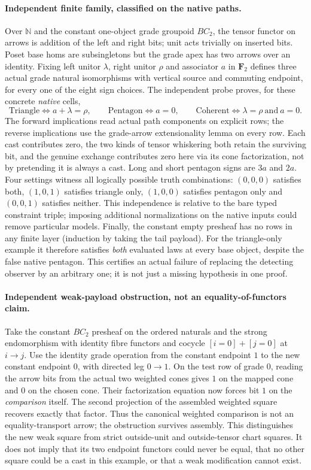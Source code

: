 \documentclass[11pt]{article}
\begin{document}
\paragraph{Independent finite family, classified on the native paths.}
Over $\mathbb{N}$ and the constant one-object grade groupoid $BC_2$,
the tensor functor on arrows is addition of the left and right bits;
unit acts trivially on inserted bits. Poset base homs are subsingletons
but the grade apex has two arrows over an identity. Fixing left unitor
$\lambda$, right unitor $\rho$ and associator $a$ in $\mathbf F_2$
defines three actual grade natural isomorphisms with vertical source
and commuting endpoint, for every one of the eight sign choices.
The independent probe proves, for these concrete \emph{native} cells,
\[
  \mathrm{Triangle}\iff a+\lambda=\rho,\qquad
  \mathrm{Pentagon}\iff a=0,\qquad
  \mathrm{Coherent}\iff \lambda=\rho\ \text{and}\ a=0.
\]
The forward implications read actual path components on explicit rows;
the reverse implications use the grade-arrow extensionality lemma on
every row. Each cast contributes zero, the two kinds of tensor
whiskering both retain the surviving bit, and the genuine exchange
contributes zero here via its cone factorization, not by pretending it
is always a cast. Long and short pentagon signs are $3a$ and $2a$.
Four settings witness all logically possible truth combinations:
$(0,0,0)$ satisfies both, $(1,0,1)$ satisfies triangle only,
$(1,0,0)$ satisfies pentagon only and $(0,0,1)$ satisfies neither.
This independence is relative to the bare typed constraint triple;
imposing additional normalizations on the native inputs could remove
particular models. Finally, the constant empty presheaf has no rows in
any finite layer (induction by taking the tail payload). For the
triangle-only example it therefore satisfies \emph{both} evaluated
laws at every base object, despite the false native pentagon. This
certifies an actual failure of replacing the detecting observer by an
arbitrary one; it is not just a missing hypothesis in one proof.
\paragraph{Independent weak-payload obstruction, not an equality-of-functors claim.}
Take the constant $BC_2$ presheaf on the ordered naturals and the strong
endomorphism with identity fibre functors and cocycle
$[i=0]+[j=0]$ at $i\to j$. Use the identity grade operation from the
constant endpoint $1$ to the new constant endpoint $0$, with directed
leg $0\to1$. On the test row of grade $0$, reading the arrow bits from
the actual two weighted cones gives $1$ on the mapped cone and $0$ on the
chosen cone. Their factorization equation now forces bit $1$ on the
\emph{comparison} itself. The second projection of the assembled weighted
square recovers exactly that factor. Thus the canonical weighted comparison
is not an equality-transport arrow; the obstruction survives assembly.
This distinguishes the new weak square from strict outside-unit and
outside-tensor chart squares. It does not imply that its two endpoint
functors could never be equal, that no other square could be a cast in
this example, or that a weak modification cannot exist.
\end{document}
